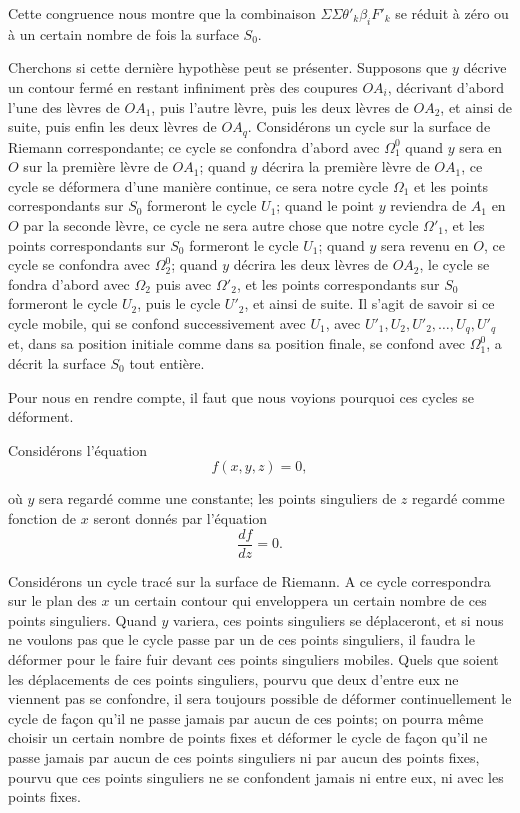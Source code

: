 \documentclass{article}
\begin{document}
Cette congruence nous montre que la combinaison $\Sigma \Sigma \theta'_{k} \beta_{i}F'_{k}$ se réduit à zéro ou à un certain nombre de fois la surface $S_{0}$.

Cherchons si cette dernière hypothèse peut se présenter. Supposons que $y$ décrive un contour fermé en restant infiniment près des coupures $OA_{i}$, décrivant d'abord l'une des lèvres de $OA_{1}$, puis l'autre lèvre, puis les deux lèvres de $OA_{2}$, et ainsi de suite, puis enfin les deux lèvres de $OA_{q}$. Considérons un cycle sur la surface de Riemann correspondante; ce cycle se confondra d'abord avec $\Omega^{0}_{1}$ quand $y$ sera en $O$ sur la première lèvre de $OA_{1}$; quand $y$ décrira la première lèvre de $OA_{1}$, ce cycle se déformera d'une manière continue, ce sera notre cycle $\Omega_{1}$ et les points correspondants sur $S_{0}$ formeront le cycle $U_{1}$; quand le point $y$ reviendra de $A_{1}$ en $O$ par la seconde lèvre, ce cycle ne sera autre chose que notre cycle $\Omega'_{1}$, et les points correspondants sur $S_{0}$ formeront le cycle $U_{1}$; quand $y$ sera revenu en $O$, ce cycle se confondra avec $\Omega^{0}_{2}$; quand $y$ décrira les deux lèvres de $OA_{2}$, le cycle se fondra d'abord avec $\Omega_{2}$ puis avec $\Omega'_{2}$, et les points correspondants sur $S_{0}$ formeront le cycle $U_{2}$, puis le cycle $U'_{2}$, et ainsi de suite. Il s'agit de savoir si ce cycle mobile, qui se confond successivement avec $U_{1}$, avec $U'_{1}, U_{2}, U'_{2}, \ldots, U_{q}, U'_{q}$ et, dans sa position initiale comme dans sa position finale, se confond avec $\Omega^{0}_{1}$, a décrit la surface $S_{0}$ tout entière.

Pour nous en rendre compte, il faut que nous voyions pourquoi ces cycles se déforment.

Considérons l'équation
\[ f(x, y, z) = 0, \]

où $y$ sera regardé comme une constante; les points singuliers de $z$ regardé comme fonction de $x$ seront donnés par l'équation
\[ \frac{df}{dz} = 0. \]

Considérons un cycle tracé sur la surface de Riemann. A ce cycle correspondra sur le plan des $x$ un certain contour qui enveloppera un certain nombre de ces points singuliers. Quand $y$ variera, ces points singuliers se déplaceront, et si nous ne voulons pas que le cycle passe par un de ces points singuliers, il faudra le déformer pour le faire fuir devant ces points singuliers mobiles. Quels que soient les déplacements de ces points singuliers, pourvu que deux d'entre eux ne viennent pas se confondre, il sera toujours possible de déformer continuellement le cycle de façon qu'il ne passe jamais par aucun de ces points; on pourra même choisir un certain nombre de points fixes et déformer le cycle de façon qu'il ne passe jamais par aucun de ces points singuliers ni par aucun des points fixes, pourvu que ces points singuliers ne se confondent jamais ni entre eux, ni avec les points fixes.
\end{document}
